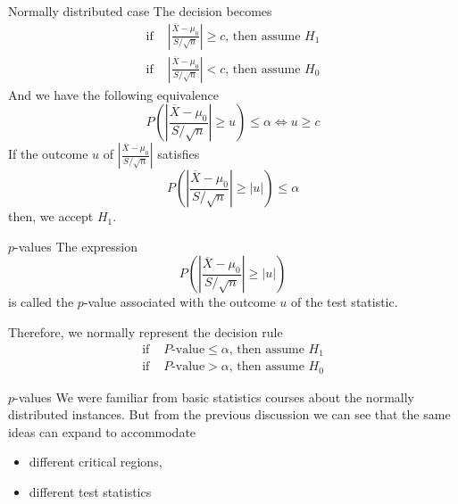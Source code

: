 \documentclass{beamer}
\begin{document}
\begin{frame}{Normally distributed case}
	The decision becomes
	\begin{equation*}
		\begin{split}
		\text{if }& |\frac{\overline{X}-\mu_0}{S/\sqrt{n}}| \ge c \text{, then assume }H_1\\
		\text{if }& |\frac{\overline{X}-\mu_0}{S/\sqrt{n}}| < c \text{, then assume }H_0
		\end{split}
	\end{equation*}
	And we have the following equivalence
	\begin{equation*}
		P(|\frac{\overline{X}-\mu_0}{S/\sqrt{n}}|\ge u)\le \alpha \iff u \ge c
	\end{equation*}
	If the outcome $u$ of $|\frac{\overline{X}-\mu_0}{S/\sqrt{n}}|$ satisfies 
	\begin{equation*}
		P(|\frac{\overline{X}-\mu_0}{S/\sqrt{n}}|\ge |u|)\le \alpha 
	\end{equation*}
	then, we accept $H_1$.
\end{frame}
\begin{frame}{$p$-values}
	The expression 
	\begin{equation*}
			P(|\frac{\overline{X}-\mu_0}{S/\sqrt{n}}|\ge |u|)
	\end{equation*}
	is called the $p$-value associated with the outcome $u$ of the test statistic.
	
	Therefore, we normally represent the decision rule
		\begin{equation*}
		\begin{split}
			\text{if }& P\text{-value} \le \alpha \text{, then assume }H_1\\
			\text{if }& P\text{-value} > \alpha \text{, then assume }H_0
		\end{split}
	\end{equation*}
\end{frame}

\begin{frame}{$p$-values}
	We were familiar from basic statistics courses about the normally distributed instances. But from the previous discussion we can see that the same ideas can expand to accommodate
	
	\begin{itemize}
		\item different critical regions,
		\item different test statistics
	\end{itemize}
\end{frame}
\end{document}
